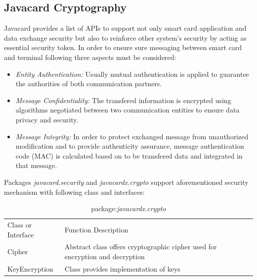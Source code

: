 \subsection{Javacard Cryptography}
Javacard provides a list of APIs to support not only smart card application and data exchange security but also to reinforce other system's security by acting as essential security token. 
In order to ensure sure messaging between smart card and terminal following three aspects must be considered:
\begin{itemize}
\item \emph{Entity Authentication:} Usually mutual authentication is applied to guarantee the authorities of both communication partners.
\item \emph{Message Confidentiality:} The transfered information is encrypted using algorithms negotiated between two communication entities to ensure data privacy and security.
\item \emph{Message Integrity:} In order to protect exchanged message from unauthorized modification and to provide authenticity assurance, message authentication code (MAC) is calculated based on to be transfered data and integrated in that message.
\end{itemize}
Packages \emph{javacard.security} and \emph{javacardx.crypto} support aforementioned security mechanism with following class and interfaces\cite{chen}:

\begin{table}[!htbp]
\caption{package:\emph{javacardx.crypto}}
\begin{tabular}{lllll}
\hline\hline
Class or Interface & Function Description\\[0.5ex]
Cipher & \parbox[t]{10cm}{Abstract class offers cryptographic cipher used for encryption and decryption}\\
KeyEncryption & Class provides implementation of keys\\
\hline
\end{tabular}
\label{table:javacardx-crypto}
\end{table}


